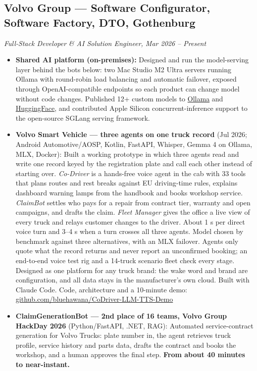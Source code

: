 \documentclass[a4paper,10pt]{article}
\begin{document}
\subsection*{Volvo Group --- Software Configurator, Software Factory, DTO, Gothenburg}
\textit{Full-Stack Developer \& AI Solution Engineer, Mar 2026 -- Present}
\begin{itemize}

  \item \textbf{Shared AI platform (on-premises):} Designed and run the model-serving layer behind the bots below: two Mac Studio M2 Ultra servers running Ollama with round-robin load balancing and automatic failover, exposed through OpenAI-compatible endpoints so each product can change model without code changes. Published 12+ custom models to \href{https://ollama.com/bluehawana}{Ollama} and \href{https://huggingface.co/bluehawana}{HuggingFace}, and contributed Apple Silicon concurrent-inference support to the open-source SGLang serving framework.

  \item \textbf{Volvo Smart Vehicle --- three agents on one truck record} (Jul 2026; Android Automotive/AOSP, Kotlin, FastAPI, Whisper, Gemma 4 on Ollama, MLX, Docker): Built a working prototype in which three agents read and write one record keyed by the registration plate and call each other instead of starting over. \textit{Co-Driver} is a hands-free voice agent in the cab with 33 tools that plans routes and rest breaks against EU driving-time rules, explains dashboard warning lamps from the handbook and books workshop service. \textit{ClaimBot} settles who pays for a repair from contract tier, warranty and open campaigns, and drafts the claim. \textit{Fleet Manager} gives the office a live view of every truck and relays customer changes to the driver. About 1 s per direct voice turn and 3--4 s when a turn crosses all three agents. Model chosen by benchmark against three alternatives, with an MLX failover. Agents only quote what the record returns and never report an unconfirmed booking; an end-to-end voice test rig and a 14-truck scenario fleet check every stage. Designed as one platform for any truck brand: the wake word and brand are configuration, and all data stays in the manufacturer's own cloud. Built with Claude Code. Code, architecture and a 10-minute demo: \href{https://github.com/bluehawana/CoDriver-LLM-TTS-Demo}{github.com/bluehawana/CoDriver-LLM-TTS-Demo}

  \item \textbf{ClaimGenerationBot --- 2nd place of 16 teams, Volvo Group HackDay 2026} (Python/FastAPI, .NET, RAG): Automated service-contract generation for Volvo Trucks: plate number in, the agent retrieves truck profile, service history and parts data, drafts the contract and books the workshop, and a human approves the final step. \textbf{From about 40 minutes to near-instant.}


\end{itemize}
\end{document}
